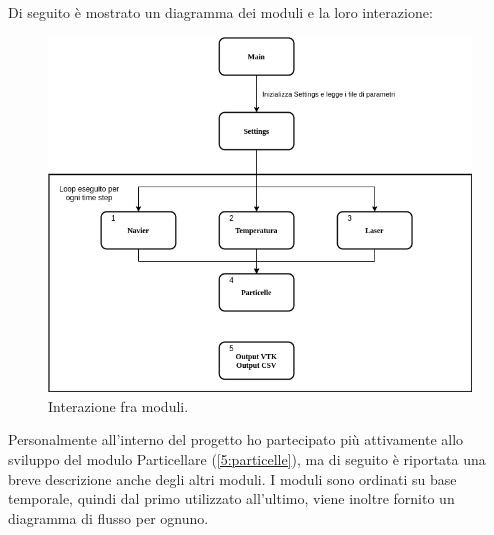 Di seguito è mostrato un diagramma dei moduli e la loro interazione:
\begin{figure}[H]
    \centering
    \includegraphics[width=\linewidth]{diagrammi/diagrammiModuli.png}
    \caption{Interazione fra moduli.}
\end{figure}
Personalmente all'interno del progetto ho partecipato più attivamente allo sviluppo del modulo Particellare (\ref*{5:particelle}), ma di seguito è riportata
una breve descrizione anche degli altri moduli. I moduli sono ordinati su base temporale, quindi dal primo utilizzato all'ultimo, viene inoltre fornito un diagramma di flusso per ognuno.

